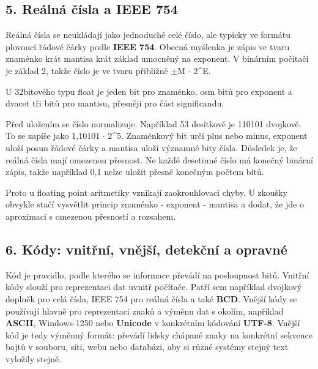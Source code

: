 

\subsection*{5. Reálná čísla a IEEE 754}

Reálná čísla se neukládají jako jednoduché celé číslo, ale typicky ve formátu plovoucí řádové čárky podle \textbf{IEEE 754}. Obecná myšlenka je zápis ve tvaru znaménko krát mantisa krát základ umocněný na exponent. V binárním počítači je základ 2, takže číslo je ve tvaru přibližně $\pm$M $\cdot$ 2\textasciicircum{}E.

U 32bitového typu float je jeden bit pro znaménko, osm bitů pro exponent a dvacet tři bitů pro mantisu, přesněji pro část significandu.

Před uložením se číslo normalizuje. Například 53 desítkově je 110101 dvojkově. To se zapíše jako 1,10101 $\cdot$ 2\textasciicircum{}5. Znaménkový bit určí plus nebo minus, exponent uloží posun řádové čárky a mantisa uloží významné bity čísla. Důsledek je, že reálná čísla mají omezenou přesnost. Ne každé desetinné číslo má konečný binární zápis, takže například 0,1 nelze uložit přesně konečným počtem bitů.

Proto u floating point aritmetiky vznikají zaokrouhlovací chyby. U zkoušky obvykle stačí vysvětlit princip znaménko - exponent - mantisa a dodat, že jde o aproximaci s omezenou přesností a rozsahem.

\subsection*{6. Kódy: vnitřní, vnější, detekční a opravné}

Kód je pravidlo, podle kterého se informace převádí na posloupnost bitů. Vnitřní kódy slouží pro reprezentaci dat uvnitř počítače. Patří sem například dvojkový doplněk pro celá čísla, IEEE 754 pro reálná čísla a také \textbf{BCD}. Vnější kódy se používají hlavně pro reprezentaci znaků a výměnu dat s okolím, například \textbf{ASCII}, Windows-1250 nebo \textbf{Unicode} v konkrétním kódování \textbf{UTF-8}. Vnější kód je tedy výměnný formát: převádí lidsky chápané znaky na konkrétní sekvence bajtů v souboru, síti, webu nebo databázi, aby si různé systémy stejný text vyložily stejně.

